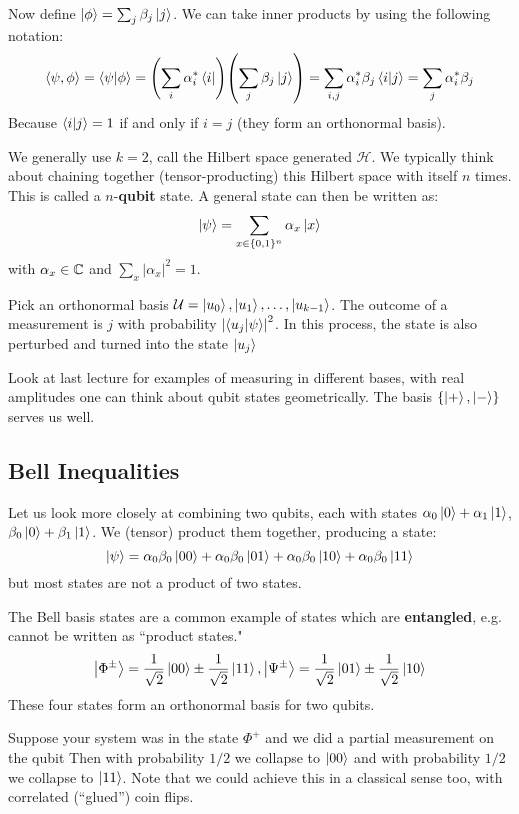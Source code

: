 Now define $\ket{\phi} = \sum_j \beta_j \ket{j}$. We can take inner products by using the following notation:
\[ \langle \psi, \phi \rangle = \braket{\psi}{\phi} = \qty(\sum_{i} \alpha_i^* \bra{i})\qty(\sum_{j} \beta_j \ket{j}) = \sum_{i,j} \alpha_i^* \beta_j \braket{i}{j} = \sum_{j} \alpha_i^* \beta_j\]
Because $\braket{i}{j} = 1$ if and only if $i = j$ (they form an orthonormal basis).

We generally use $k = 2$, call the Hilbert space generated $\mathcal{H}$. We typically think about chaining together (tensor-producting)
this Hilbert space with itself $n$ times. This is called a $n$-\textbf{qubit} state. A general state can then be written as:
\[ \ket{\psi} = \sum_{x \in \{0, 1\}^n} \alpha_x \ket{x} \]
with $\alpha_x \in \operatorname{\mathbb{C}}$ and $\sum_{x} |\alpha_x|^2 = 1$.

\begin{note}
    Pick an orthonormal basis $\mathcal{U} = \ket{u_0}, \ket{u_1}, \dots, \ket{u_{k - 1}}$. The outcome of a measurement is $j$ with
    probability $\qty|\braket{u_j}{\psi}|^2$. In this process, the state is also perturbed and turned into the state $\ket{u_j}$
\end{note}

Look at last lecture for examples of measuring in different bases, with real amplitudes one can think about qubit states geometrically.
The basis $\{ \ket{+}, \ket{-} \}$ serves us well.

\subsection{Bell Inequalities}
Let us look more closely at combining two qubits, each with states $\alpha_0 \ket{0} + \alpha_1 \ket{1}$, $\beta_0 \ket{0} + \beta_1 \ket{1}$.
We (tensor) product them together, producing a state:
\[ \ket{\psi} = \alpha_0 \beta_0 \ket{00} + \alpha_0 \beta_0 \ket{01} + \alpha_0 \beta_0 \ket{10} + \alpha_0 \beta_0 \ket{11} \]
but most states are not a product of two states.

The Bell basis states are a common example of states which are \textbf{entangled}, e.g. cannot be written as ``product states."
\[ \ket{\Phi^{\pm}} = \frac{1}{\sqrt{2}} \ket{00} \pm \frac{1}{\sqrt{2}} \ket{11}, \ket{\Psi^{\pm}} = \frac{1}{\sqrt{2}} \ket{01} \pm \frac{1}{\sqrt{2}} \ket{10}  \]
These four states form an orthonormal basis for two qubits.

Suppose your system was in the state $\Phi^+$ and we did a partial measurement on the qubit
Then with probability $1/2$ we collapse to $\ket{00}$ and with probability $1/2$ we collapse to $\ket{11}$. Note that we could achieve this
in a classical sense too, with correlated (``glued'') coin flips.

